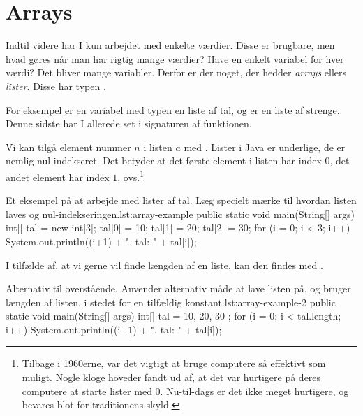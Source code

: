 \section{Arrays}

    Indtil videre har I kun arbejdet med enkelte værdier. Disse er
    brugbare, men hvad gøres når man har rigtig mange værdier? Have
    en enkelt variabel for hver værdi? Det bliver mange variabler.
    Derfor er der noget, der hedder \emph{arrays} ellers \emph{lister}.
    Disse har typen .

    For eksempel er en variabel med typen  en liste
    af tal, og  er en liste af strenge. Denne
    sidste har I allerede set i signaturen af 
    funktionen.

    Vi kan tilgå element nummer \(n\) i listen \(a\) med
    .  Lister i Java er underlige, de er nemlig
    nul-indekseret. Det betyder at det første element i listen har
    index \(0\), det andet element har index \(1\),
    ovs.\footnote{Tilbage i 1960erne, var det vigtigt at bruge
    computere så effektivt som muligt. Nogle kloge hoveder
    fandt ud af, at det var hurtigere på deres computere at starte
    lister med 0. Nu-til-dags er det ikke meget hurtigere, og
    bevares blot for traditionens skyld.}

    \begin{JavaCode}{Et eksempel på at arbejde med lister af tal. Læg specielt mærke til hvordan listen laves og nul-indekseringen.}{lst:array-example}
        public static void main(String[] args) {
            int[] tal = new int[3];
            tal[0] = 10;
            tal[1] = 20;
            tal[2] = 30;
            for (i = 0; i < 3; i++) {
                System.out.println((i+1) + ". tal: "
                                         + tal[i]);
            }
        }
    \end{JavaCode}

    I tilfælde af, at vi gerne vil finde længden af en liste, kan den findes med
    .

    \begin{JavaCode}{Alternativ til overstående. Anvender alternativ måde at lave listen på, og bruger længden af listen, i stedet for en tilfældig konstant.}{lst:array-example-2}
        public static void main(String[] args) {
            int[] tal = { 10, 20, 30 };
            for (i = 0; i < tal.length; i++) {
                System.out.println((i+1) + ". tal: "
                                         + tal[i]);
            }
        }
    \end{JavaCode}

